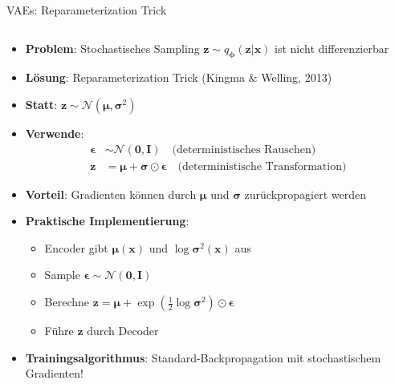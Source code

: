 \documentclass[aspectratio=1610, xcolor=dvipsnames, 9pt]{beamer}
\begin{document}
\begin{frame}{VAEs: Reparameterization Trick}
  \begin{columns}
    \begin{column}{1\textwidth}
      \begin{itemize}
        \item \textbf{Problem}: Stochastisches Sampling $\mathbf{z} \sim q_{\boldsymbol{\phi}}(\mathbf{z}|\mathbf{x})$ ist nicht differenzierbar
        \item \textbf{Lösung}: Reparameterization Trick (Kingma \& Welling, 2013)
        \item \textbf{Statt}: $\mathbf{z} \sim \mathcal{N}(\boldsymbol{\mu}, \boldsymbol{\sigma}^2)$
        \item \textbf{Verwende}: 
        \begin{align}
          \boldsymbol{\epsilon} &\sim \mathcal{N}(\mathbf{0}, \mathbf{I}) \quad \text{(deterministisches Rauschen)} \\
          \mathbf{z} &= \boldsymbol{\mu} + \boldsymbol{\sigma} \odot \boldsymbol{\epsilon} \quad \text{(deterministische Transformation)}
        \end{align}
        \item \textbf{Vorteil}: Gradienten können durch $\boldsymbol{\mu}$ und $\boldsymbol{\sigma}$ zurückpropagiert werden
        \item \textbf{Praktische Implementierung}:
        \begin{itemize}
          \item Encoder gibt $\boldsymbol{\mu}(\mathbf{x})$ und $\log \boldsymbol{\sigma}^2(\mathbf{x})$ aus
          \item Sample $\boldsymbol{\epsilon} \sim \mathcal{N}(\mathbf{0}, \mathbf{I})$
          \item Berechne $\mathbf{z} = \boldsymbol{\mu} + \exp(\frac{1}{2}\log \boldsymbol{\sigma}^2) \odot \boldsymbol{\epsilon}$
          \item Führe $\mathbf{z}$ durch Decoder
        \end{itemize}
        \item \textbf{Trainingsalgorithmus}: Standard-Backpropagation mit stochastischem Gradienten!
      \end{itemize}
    \end{column}
  \end{columns}
\end{frame}
\end{document}
